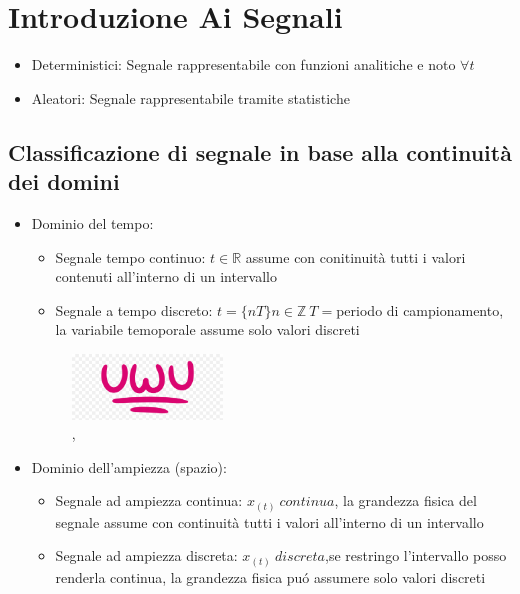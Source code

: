 \section{Introduzione Ai Segnali}
    \begin{itemize}
        \item {
            Deterministici: Segnale rappresentabile con funzioni analitiche e noto $\forall t$
        }
        \item {
            Aleatori: Segnale rappresentabile tramite statistiche 
        }
    \end{itemize}
    \subsection{Classificazione di segnale in base alla continuità dei domini}
        \begin{itemize}
            \item {Dominio del tempo:
                    \begin{itemize}
                        \item{Segnale tempo continuo: $t \in \mathbb{R}$ assume con conitinuità tutti i valori contenuti all'interno di un intervallo}
                        \item {Segnale a tempo discreto: $t = \{ nT \} n \in \mathbb{Z} \ T=$periodo di campionamento, la variabile temoporale assume solo valori discreti}
                    \end{itemize}
                    \begin{figure}[h]
                        \centering
                        \includegraphics[width=4cm]{media/uwu.png}
                        \caption{\color{purple}{tempo continuo}, \color{blue}{tempo discreto}}
                        \label{fig:Dominio del tempo}
                    \end{figure}
            }
            \item {Dominio dell'ampiezza (spazio):
                    \begin{itemize}
                        \item{Segnale ad ampiezza continua: $x_{(t)}\ continua$, la grandezza fisica del segnale assume con continuità tutti i valori all'interno di un intervallo}
                        \item {Segnale ad ampiezza discreta: $x_{(t)}\ discreta$,se restringo l'intervallo posso renderla continua, la grandezza fisica puó assumere solo valori discreti}

\end{itemize}}
\end{itemize}
